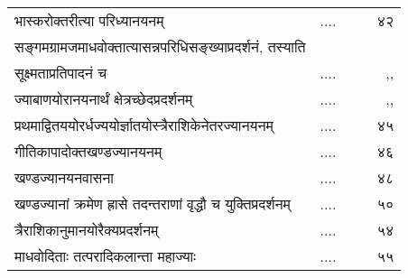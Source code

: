 \documentclass[11pt, openany]{book}
\begin{document}
\begin{tabular}{lp{1cm}p{.2cm}r}
भास्करोक्तरीत्या परिध्यानयनम्  & ....&&  ~ ४२\\
सङ्गमग्रामजमाधवोक्तात्यासन्नपरिधिसङ्ख्याप्रदर्शनं, तस्याति\\
सूक्ष्मताप्रतिपादनं च  & ....&&  ~ ,,\\
ज्याबाणयोरानयनार्थं क्षेत्रच्छेदप्रदर्शनम् & ....&&  ~ ,,\\
प्रथमाद्वितययोरर्धज्ययोर्ज्ञातयोस्त्रैराशिकेनेतरज्यानयनम्  & ....&&  ~ ४५\\
गीतिकापादोक्तखण्डज्यानयनम्  & ....&&  ~ ४६\\
खण्डज्यानयनवासना  & ....&&  ~ ४८\\
खण्डज्यानां क्रमेण ह्रासे तदन्तराणां वृद्धौ च युक्तिप्रदर्शनम्  & ....&&  ~ ५०\\
त्रैराशिकानुमानयोरैक्यप्रदर्शनम्  & ....&&  ~ ५४\\
माधवोदिताः तत्परादिकलान्ता महाज्याः  & ....&&  ~ ५५\\
\end{tabular}	
\end{document}
